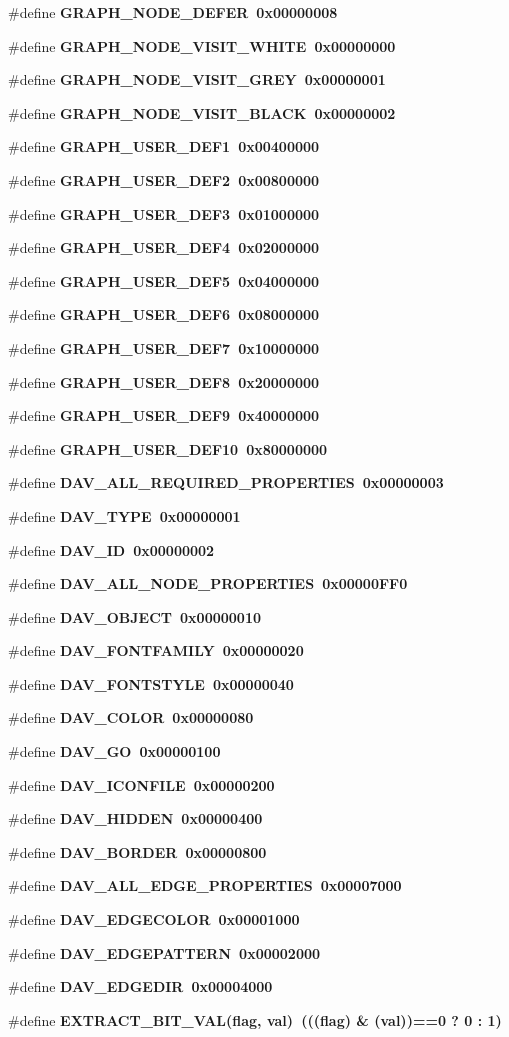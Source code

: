 \begin{CompactItemize}
\item 
\#define \bf{GRAPH\_\-NODE\_\-DEFER}~0x00000008
\item 
\#define \bf{GRAPH\_\-NODE\_\-VISIT\_\-WHITE}~0x00000000
\item 
\#define \bf{GRAPH\_\-NODE\_\-VISIT\_\-GREY}~0x00000001
\item 
\#define \bf{GRAPH\_\-NODE\_\-VISIT\_\-BLACK}~0x00000002
\item 
\#define \bf{GRAPH\_\-USER\_\-DEF1}~0x00400000
\item 
\#define \bf{GRAPH\_\-USER\_\-DEF2}~0x00800000
\item 
\#define \bf{GRAPH\_\-USER\_\-DEF3}~0x01000000
\item 
\#define \bf{GRAPH\_\-USER\_\-DEF4}~0x02000000
\item 
\#define \bf{GRAPH\_\-USER\_\-DEF5}~0x04000000
\item 
\#define \bf{GRAPH\_\-USER\_\-DEF6}~0x08000000
\item 
\#define \bf{GRAPH\_\-USER\_\-DEF7}~0x10000000
\item 
\#define \bf{GRAPH\_\-USER\_\-DEF8}~0x20000000
\item 
\#define \bf{GRAPH\_\-USER\_\-DEF9}~0x40000000
\item 
\#define \bf{GRAPH\_\-USER\_\-DEF10}~0x80000000
\item 
\#define \bf{DAV\_\-ALL\_\-REQUIRED\_\-PROPERTIES}~0x00000003
\item 
\#define \bf{DAV\_\-TYPE}~0x00000001
\item 
\#define \bf{DAV\_\-ID}~0x00000002
\item 
\#define \bf{DAV\_\-ALL\_\-NODE\_\-PROPERTIES}~0x00000FF0
\item 
\#define \bf{DAV\_\-OBJECT}~0x00000010
\item 
\#define \bf{DAV\_\-FONTFAMILY}~0x00000020
\item 
\#define \bf{DAV\_\-FONTSTYLE}~0x00000040
\item 
\#define \bf{DAV\_\-COLOR}~0x00000080
\item 
\#define \bf{DAV\_\-GO}~0x00000100
\item 
\#define \bf{DAV\_\-ICONFILE}~0x00000200
\item 
\#define \bf{DAV\_\-HIDDEN}~0x00000400
\item 
\#define \bf{DAV\_\-BORDER}~0x00000800
\item 
\#define \bf{DAV\_\-ALL\_\-EDGE\_\-PROPERTIES}~0x00007000
\item 
\#define \bf{DAV\_\-EDGECOLOR}~0x00001000
\item 
\#define \bf{DAV\_\-EDGEPATTERN}~0x00002000
\item 
\#define \bf{DAV\_\-EDGEDIR}~0x00004000
\item 
\#define \bf{EXTRACT\_\-BIT\_\-VAL}(flag, val)~(((flag) \& (val))==0 ? 0 : 1)
\end{CompactItemize}
